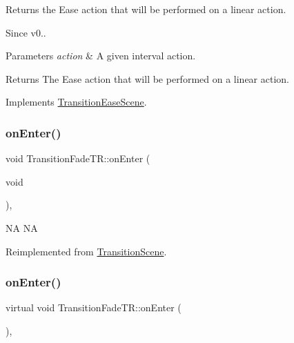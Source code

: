 Returns the Ease action that will be performed on a linear action. \begin{DoxySince}{Since}
v0..
\end{DoxySince}

\begin{DoxyParams}{Parameters}
{\em action} & A given interval action. \\
\hline
\end{DoxyParams}
\begin{DoxyReturn}{Returns}
The Ease action that will be performed on a linear action. 
\end{DoxyReturn}


Implements \hyperlink{classTransitionEaseScene_a6f27540600b0d703ed30adc8976e65df}{Transition\+Ease\+Scene}.

\mbox{\label{classTransitionFadeTR_aff4ebcd832386860100daad82ad48bc2}} 
\subsubsection{\texorpdfstring{on\+Enter()}{onEnter()}\hspace{0.1cm}{\footnotesize\ttfamily [1/2]}}
{\footnotesize\ttfamily void Transition\+Fade\+T\+R\+::on\+Enter (\begin{DoxyParamCaption}\item[{void}]{ }\end{DoxyParamCaption})\hspace{0.3cm}{\ttfamily [override]}, {\ttfamily [virtual]}}

NA  NA 

Reimplemented from \hyperlink{classTransitionScene_aace390a1bd8f3c73bb650a1e256a0f83}{Transition\+Scene}.

\mbox{\label{classTransitionFadeTR_a0233b4bea549912854460a1a969f8bb4}} 
\subsubsection{\texorpdfstring{on\+Enter()}{onEnter()}\hspace{0.1cm}{\footnotesize\ttfamily [2/2]}}
{\footnotesize\ttfamily virtual void Transition\+Fade\+T\+R\+::on\+Enter (\begin{DoxyParamCaption}{ }\end{DoxyParamCaption})\hspace{0.3cm}{\ttfamily [override]}, {\ttfamily [virtual]}}

